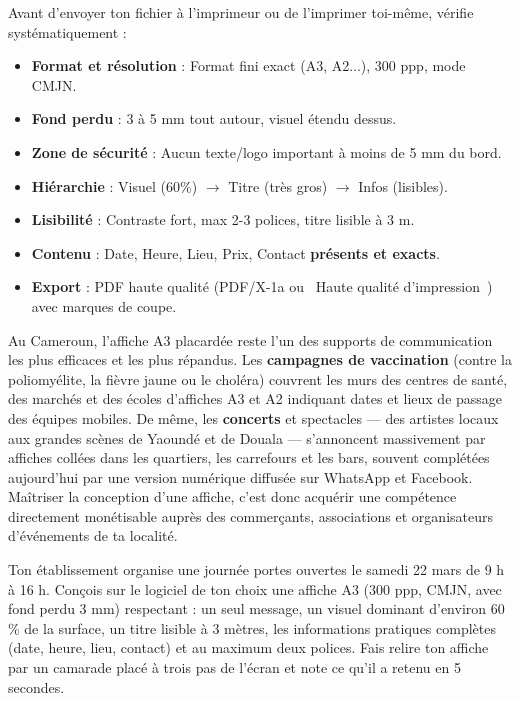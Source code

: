 \documentclass[11pt]{article}
\begin{document}
\begin{aretenir}
Avant d'envoyer ton fichier à l'imprimeur ou de l'imprimer toi-même, vérifie systématiquement :
\begin{itemize}
\item \textbf{Format et résolution} : Format fini exact (A3, A2...), 300 ppp, mode CMJN.
\item \textbf{Fond perdu} : 3 à 5 mm tout autour, visuel étendu dessus.
\item \textbf{Zone de sécurité} : Aucun texte/logo important à moins de 5 mm du bord.
\item \textbf{Hiérarchie} : Visuel (60\%) $\to$ Titre (très gros) $\to$ Infos (lisibles).
\item \textbf{Lisibilité} : Contraste fort, max 2-3 polices, titre lisible à 3 m.
\item \textbf{Contenu} : Date, Heure, Lieu, Prix, Contact \textbf{présents et exacts}.
\item \textbf{Export} : PDF haute qualité (PDF/X-1a ou \og~Haute qualité d'impression~\fg{}) avec marques de coupe.
\end{itemize}
\end{aretenir}

\begin{savaistu}
Au Cameroun, l'affiche A3 placardée reste l'un des supports de communication les plus efficaces et les plus répandus. Les \textbf{campagnes de vaccination} (contre la poliomyélite, la fièvre jaune ou le choléra) couvrent les murs des centres de santé, des marchés et des écoles d'affiches A3 et A2 indiquant dates et lieux de passage des équipes mobiles. De même, les \textbf{concerts} et spectacles — des artistes locaux aux grandes scènes de Yaoundé et de Douala — s'annoncent massivement par affiches collées dans les quartiers, les carrefours et les bars, souvent complétées aujourd'hui par une version numérique diffusée sur WhatsApp et Facebook. Maîtriser la conception d'une affiche, c'est donc acquérir une compétence directement monétisable auprès des commerçants, associations et organisateurs d'événements de ta localité.
\end{savaistu}

\begin{exercice}
Ton établissement organise une journée portes ouvertes le samedi 22 mars de 9 h à 16 h. Conçois sur le logiciel de ton choix une affiche A3 (300 ppp, CMJN, avec fond perdu 3 mm) respectant : un seul message, un visuel dominant d'environ 60 \% de la surface, un titre lisible à 3 mètres, les informations pratiques complètes (date, heure, lieu, contact) et au maximum deux polices. Fais relire ton affiche par un camarade placé à trois pas de l'écran et note ce qu'il a retenu en 5 secondes.
\end{exercice}
\end{document}
